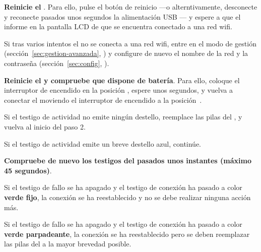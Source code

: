 \begin{enumeratecompact}

\item \textbf{Reinicie el \MIE}. Para ello, pulse el botón de reinicio  ---o alterntivamente, desconecte y reconecte pasados unos segundos la alimentación USB --- y espere a que el \MI informe en la pantalla LCD  de que se encuentra conectado a una red wifi.

\begin{itemizecompact}

\item Si tras varios intentos el \MI no se conecta a una red wifi, entre en el modo de gestión (sección~\ref{sec:gestion-avanzada}, \textit{}) y configure de nuevo el nombre de la red y la contraseña (sección~\ref{sec:config}, \textit{}).

\end{itemizecompact}

\item \textbf{Reinicie el \MEE y compruebe que dispone de batería}. Para ello, coloque el interruptor de encendido  en la posición \off, espere unos segundos, y vuelva a conectar el \ME moviendo el interruptor de encendido  a la posición~\on. 

\begin{itemizecompact}

\item Si el testigo de actividad  no emite ningún destello, reemplace las pilas del \ME, y vuelva al inicio del paso 2.

\item Si el testigo de actividad  emite un breve destello azul, continúe. 

\end{itemizecompact}


\item \textbf{Compruebe de nuevo los testigos del \MIE pasados unos instantes (máximo 45 segundos)}.

\begin{itemizecompact}

\item Si el testigo de fallo  se ha apagado y el testigo de conexión  ha pasado a color \textbf{verde fijo}, la conexión se ha reestablecido y no se debe realizar ninguna acción más.

\item Si el testigo de fallo  se ha apagado y el testigo de conexión  ha pasado a color \textbf{verde parpadeante}, la conexión se ha reestablecido pero se deben reemplazar las pilas del \ME a la mayor brevedad posible.


\end{itemizecompact}
\end{enumeratecompact}
